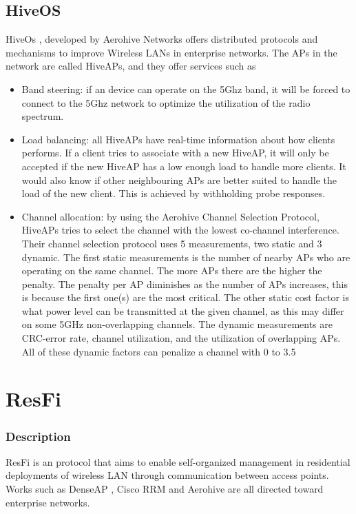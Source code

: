 \subsection{HiveOS}
HiveOs \cite{Aerohive}, developed by Aerohive Networks offers distributed protocols and mechanisms to improve Wireless LANs in enterprise networks. The APs 
in the network are called HiveAPs, and they offer services such as
\begin{itemize}
	\item Band steering: if an device can operate on the 5Ghz band, it will be forced to connect to the 5Ghz network to optimize the utilization of the radio spectrum. 
	\item Load balancing: all HiveAPs have real-time information about how clients performs. If a client tries to associate with a new HiveAP, it will only be accepted
				if the new HiveAP has a low enough load to handle more clients. It would also know if other neighbouring APs are better suited to handle the load of the new client.
				This is achieved by withholding probe responses.

	\item Channel allocation: by using the Aerohive Channel Selection Protocol, HiveAPs tries to select the channel with the lowest co-channel interference. Their channel selection protocol uses 5 measurements, two static and 3 dynamic.
	The first static measurements is the number of nearby APs who are operating on the same channel. The more APs there are the higher the penalty. The penalty per AP diminishes as the number of APs increases, this
		is because the first one(s) are the most critical. The other static cost factor is what power level can be transmitted at the given channel, as this may differ on some 5GHz non-overlapping channels. The dynamic measurements are CRC-error rate, channel utilization,
	and the utilization of overlapping APs. All of these dynamic factors can penalize a channel with 0 to 3.5%

\subsection{}
\end{itemize}

\section{ResFi}
\subsubsection{Description}
ResFi \cite{resfi} is an protocol that aims to enable self-organized management in residential deployments of wireless LAN through communication between access points. Works such as DenseAP \cite{Murty2}, Cisco RRM\cite{ciscoRRM} and Aerohive \cite{Aerohive} are all directed toward enterprise networks.

